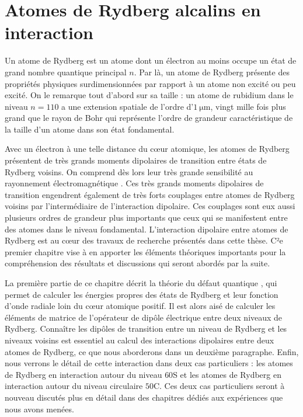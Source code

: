 \chapter{Atomes de Rydberg alcalins en interaction}
\label{chapter:Rydberg}

Un atome de Rydberg est un atome dont un électron au moins occupe un état de grand nombre quantique principal $n$.
Par là, un atome de Rydberg présente des propriétés physiques surdimensionnées par rapport à un atome non excité ou peu excité.
On le remarque tout d'abord sur sa taille : un atome de rubidium dans le niveau $n=110$ a une extension spatiale de l'ordre d'$1 ~\si{\micro\meter}$, vingt mille fois plus grand que le rayon de Bohr qui représente l'ordre de grandeur caractéristique de la taille d'un atome dans son état fondamental.

Avec un électron à une telle distance du c\oe ur atomique, les atomes de Rydberg présentent de très grands moments dipolaires de transition entre états de Rydberg voisins. On comprend dès lors leur très grande sensibilité au rayonnement électromagnétique \cite{ENS_ENHANCED}.
Ces très grands moments dipolaires de transition engendrent également de très forts couplages entre atomes de Rydberg voisins par l'intermédiaire de l'interaction dipolaire. Ces couplages sont eux aussi plusieurs ordres de grandeur plus importants que ceux qui se manifestent entre des atomes dans le niveau fondamental.
L'interaction dipolaire entre atomes de Rydberg est au c\oe ur des travaux de recherche présentés dans cette thèse. C²e premier chapitre vise à en apporter les éléments théoriques importants pour la compréhension des résultats et discussions qui seront abordés par la suite.

La première partie de ce chapitre décrit la théorie du défaut quantique \cite{TXT_GALLAGHER}, qui permet de calculer les énergies propres des états de Rydberg et leur fonction d'onde radiale loin du c\oe ur atomique positif.
Il est alors aisé de calculer les éléments de matrice de l'opérateur de dipôle électrique entre deux niveaux de Rydberg.
Connaître les dipôles de transition entre un niveau de Rydberg et les niveaux voisins est essentiel au calcul des interactions dipolaires entre deux atomes de Rydberg, ce que nous aborderons dans un deuxième paragraphe.
Enfin, nous verrons le détail de cette interaction dans deux cas particuliers  : les atomes de Rydberg en interaction autour du niveau $60$S et les atomes de Rydberg en interaction autour du niveau circulaire $50$C.
Ces deux cas particuliers seront à nouveau discutés plus en détail dans des chapitres dédiés aux expériences que nous avons menées.

